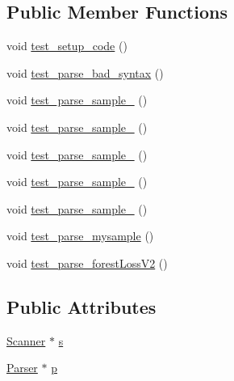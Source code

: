 \subsection*{Public Member Functions}
\begin{DoxyCompactItemize}
\item 
void \hyperlink{classParserTestSuite_ab7eff3217b5e28c9003f27c51da107ac}{test\-\_\-setup\-\_\-code} ()
\item 
void \hyperlink{classParserTestSuite_ac4a829a66a1582bee38e90ac3f0355f4}{test\-\_\-parse\-\_\-bad\-\_\-syntax} ()
\item 
void \hyperlink{classParserTestSuite_a26eed485bc2671f4ac256ef97a21b704}{test\-\_\-parse\-\_\-sample\-\_} ()
\item 
void \hyperlink{classParserTestSuite_a0f1d6af1e07e35541fb83416d5e3e229}{test\-\_\-parse\-\_\-sample\-\_} ()
\item 
void \hyperlink{classParserTestSuite_aecc132f6b6dbb2e5bba08baec64f3f65}{test\-\_\-parse\-\_\-sample\-\_} ()
\item 
void \hyperlink{classParserTestSuite_a6e5dfaf7b8ddc98001a4fec39b3f0a79}{test\-\_\-parse\-\_\-sample\-\_} ()
\item 
void \hyperlink{classParserTestSuite_a5b9a3cf2b76271244baaaaa4c8b7f7d5}{test\-\_\-parse\-\_\-sample\-\_} ()
\item 
void \hyperlink{classParserTestSuite_ae59d0f6d92f8d83833d51ef01479fdeb}{test\-\_\-parse\-\_\-mysample} ()
\item 
void \hyperlink{classParserTestSuite_a379db1a22b2c32defb8395b9b2166f76}{test\-\_\-parse\-\_\-forest\-Loss\-V2} ()
\end{DoxyCompactItemize}
\subsection*{Public Attributes}
\begin{DoxyCompactItemize}
\item 
\hyperlink{classScanner}{Scanner} $\ast$ \hyperlink{classParserTestSuite_a0c4943b3d23b79be363ba9e1ac7c02ed}{s}
\item 
\hyperlink{classParser}{Parser} $\ast$ \hyperlink{classParserTestSuite_a1d637f2f8be1326423ee5b4fd270c553}{p}
\end{DoxyCompactItemize}


